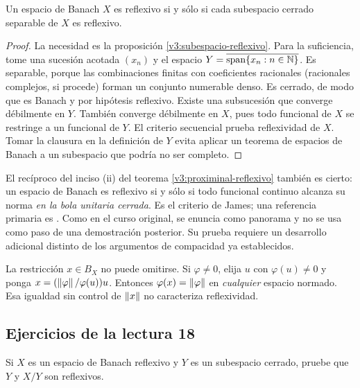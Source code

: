 \begin{proposicion}\label{v3:reflexividad-separable}
Un espacio de Banach $X$ es reflexivo si y sólo si cada subespacio cerrado separable de $X$ es reflexivo.
\end{proposicion}
\begin{proof}
La necesidad es la proposición \ref{v3:subespacio-reflexivo}. Para la suficiencia, tome una sucesión acotada $(x_n)$ y el espacio $Y=\overline{\operatorname{span}\{x_n:n\in\mathbb N\}}$. Es separable, porque las combinaciones finitas con coeficientes racionales (racionales complejos, si procede) forman un conjunto numerable denso. Es cerrado, de modo que es Banach y por hipótesis reflexivo. Existe una subsucesión que converge débilmente en $Y$. También converge débilmente en $X$, pues todo funcional de $X$ se restringe a un funcional de $Y$. El criterio secuencial prueba reflexividad de $X$. Tomar la clausura en la definición de $Y$ evita aplicar un teorema de espacios de Banach a un subespacio que podría no ser completo.
\end{proof}

\begin{observacion}
El recíproco del inciso (ii) del teorema \ref{v3:proximinal-reflexivo} también es cierto: un espacio de Banach es reflexivo si y sólo si todo funcional continuo alcanza su norma \emph{en la bola unitaria cerrada}. Es el criterio de James; una referencia primaria es \cite{james1972}. Como en el curso original, se enuncia como panorama y no se usa como paso de una demostración posterior. Su prueba requiere un desarrollo adicional distinto de los argumentos de compacidad ya establecidos.

La restricción $x\in B_X$ no puede omitirse. Si $\varphi\ne0$, elija $u$ con $\varphi(u)\ne0$ y ponga $x=(\left\lVert\varphi\right\rVert/\varphi(u))u$. Entonces $\varphi(x)=\left\lVert\varphi\right\rVert$ en \emph{cualquier} espacio normado. Esa igualdad sin control de $\left\lVert x\right\rVert$ no caracteriza reflexividad.
\end{observacion}

\subsection{Ejercicios de la lectura 18}
\begin{ejercicio}\label{ej:v3-l18-1}
Si $X$ es un espacio de Banach reflexivo y $Y$ es un subespacio cerrado, pruebe que $Y$ y $X/Y$ son reflexivos.
\end{ejercicio}


